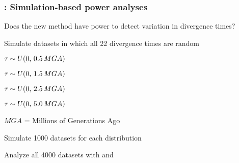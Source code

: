 \begin{frame}
    \frametitle{\dppmsbayes: Simulation-based power analyses}
    Does the new method have power to detect variation in divergence times?\\

    \bigskip
    \begin{myitemize}
        \item<2-> Simulate datasets in which all 22 divergence times are random
            \smallskip
            \begin{myitemize}
                \item $\tau_{} \sim U(0, \,0.5 \,MGA)$
                \smallskip
                \item $\tau_{} \sim U(0, \,1.5 \,MGA)$
                \smallskip
                \item $\tau_{} \sim U(0, \,2.5 \,MGA)$
                \smallskip
                \item $\tau_{} \sim U(0, \,5.0 \,MGA)$
                \smallskip
            \end{myitemize}
        \item<2-> $MGA$ = Millions of Generations Ago

        \item<3-> Simulate 1000 datasets for each \divTime{} distribution
        \item<3-> Analyze all 4000 datasets with \dppmsbayes and \msb
    \end{myitemize}
\end{frame}



